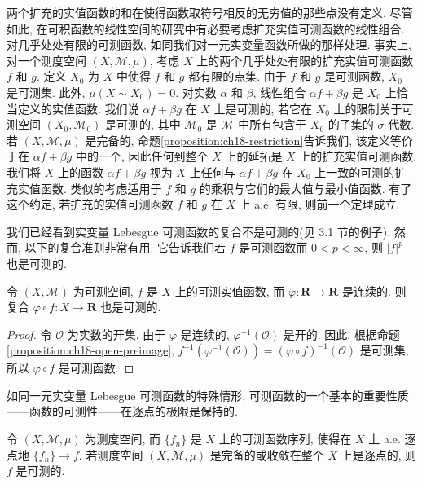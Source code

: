 \documentclass[../../main.tex]{subfiles}
\begin{document}
\begin{remark}
两个扩充的实值函数的和在使得函数取符号相反的无穷值的那些点没有定义. 尽管如此, 在可积函数的线性空间的研究中有必要考虑扩充实值可测函数的线性组合. 对几乎处处有限的可测函数, 如同我们对一元实变量函数所做的那样处理. 事实上, 对一个测度空间 $(X,\mathcal{M},\mu)$, 考虑 $X$ 上的两个几乎处处有限的扩充实值可测函数 $f$ 和 $g$. 定义 $X_{0}$ 为 $X$ 中使得 $f$ 和 $g$ 都有限的点集. 由于 $f$ 和 $g$ 是可测函数, $X_{0}$ 是可测集. 此外, $\mu(X\sim X_{0})=0$. 对实数 $\alpha$ 和 $\beta$, 线性组合 $\alpha f+\beta g$ 是 $X_{0}$ 上恰当定义的实值函数. 我们说 $\alpha f+\beta g$ 在 $X$ 上是可测的, 若它在 $X_{0}$ 上的限制关于可测空间 $(X_{0},\mathcal{M}_{0})$ 是可测的, 其中 $\mathcal{M}_{0}$ 是 $\mathcal{M}$ 中所有包含于 $X_{0}$ 的子集的 $\sigma$ 代数. 若 $(X,\mathcal{M},\mu)$ 是完备的, 命题\cref{proposition:ch18-restriction}告诉我们, 该定义等价于在 $\alpha f+\beta g$ 中的一个, 因此任何到整个 $X$ 上的延拓是 $X$ 上的扩充实值可测函数. 我们将 $X$ 上的函数 $\alpha f+\beta g$ 视为 $X$ 上任何与 $\alpha f+\beta g$ 在 $X_{0}$ 上一致的可测的扩充实值函数. 类似的考虑适用于 $f$ 和 $g$ 的乘积与它们的最大值与最小值函数. 有了这个约定, 若扩充的实值可测函数 $f$ 和 $g$ 在 $X$ 上 a.e. 有限, 则前一个定理成立.
\end{remark}

我们已经看到实变量 Lebesgue 可测函数的复合不是可测的(见 3.1 节的例子). 然而, 以下的复合准则非常有用. 它告诉我们若 $f$ 是可测函数而 $0<p<\infty$, 则 $|f|^{p}$ 也是可测的.

\begin{proposition}\label{proposition:ch18-composition}
令 $(X,\mathcal{M})$ 为可测空间, $f$ 是 $X$ 上的可测实值函数, 而 $\varphi:\mathbf{R}\to\mathbf{R}$ 是连续的. 则复合 $\varphi\circ f:X\to\mathbf{R}$ 也是可测的.
\end{proposition}

\begin{proof}
令 $\mathcal{O}$ 为实数的开集. 由于 $\varphi$ 是连续的, $\varphi^{-1}(\mathcal{O})$ 是开的. 因此, 根据命题\cref{proposition:ch18-open-preimage}, $f^{-1}(\varphi^{-1}(\mathcal{O}))=(\varphi\circ f)^{-1}(\mathcal{O})$ 是可测集, 所以 $\varphi\circ f$ 是可测函数.
\end{proof}

如同一元实变量 Lebesgue 可测函数的特殊情形, 可测函数的一个基本的重要性质——函数的可测性——在逐点的极限是保持的.

\begin{theorem}\label{theorem:ch18-limit-measurable}
令 $(X,\mathcal{M},\mu)$ 为测度空间, 而 $\{f_{n}\}$ 是 $X$ 上的可测函数序列, 使得在 $X$ 上 a.e. 逐点地 $\{f_{n}\}\to f$. 若测度空间 $(X,\mathcal{M},\mu)$ 是完备的或收敛在整个 $X$ 上是逐点的, 则 $f$ 是可测的.
\end{theorem}
\end{document}
